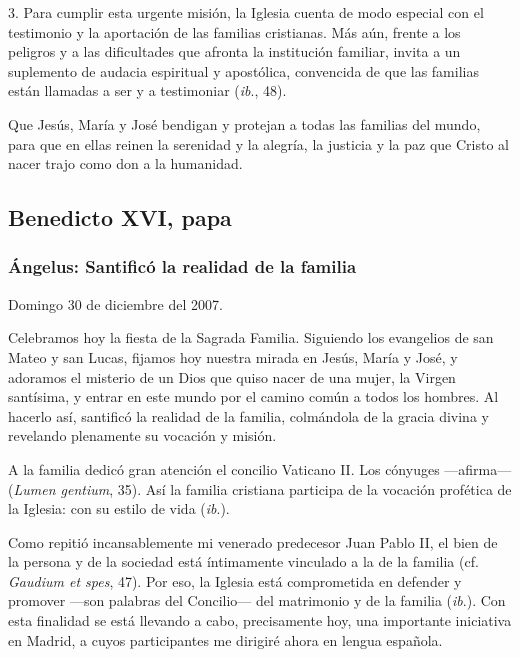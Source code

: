 3. Para cumplir esta urgente misión, la Iglesia cuenta de modo especial con el testimonio y la aportación de las familias cristianas. Más aún, frente a los peligros y a las dificultades que afronta la institución familiar, invita a un suplemento de audacia espiritual y apostólica, convencida de que las familias están llamadas a ser  y a testimoniar  (\emph{ib}., 48).

Que Jesús, María y José bendigan y protejan a todas las familias del mundo, para que en ellas reinen la serenidad y la alegría, la justicia y la paz que Cristo al nacer trajo como don a la humanidad.

\subsection{Benedicto XVI, papa}

\subsubsection{Ángelus: Santificó la realidad de la familia}

Domingo 30 de diciembre del 2007.

Celebramos hoy la fiesta de la Sagrada Familia. Siguiendo los evangelios de san Mateo y san Lucas, fijamos hoy nuestra mirada en Jesús, María y José, y adoramos el misterio de un Dios que quiso nacer de una mujer, la Virgen santísima, y entrar en este mundo por el camino común a todos los hombres. Al hacerlo así, santificó la realidad de la familia, colmándola de la gracia divina y revelando plenamente su vocación y misión.

A la familia dedicó gran atención el concilio Vaticano II. Los cónyuges ---afirma---  (\emph{Lumen gentium}, 35). Así la familia cristiana participa de la vocación profética de la Iglesia: con su estilo de vida  (\emph{ib}.).

Como repitió incansablemente mi venerado predecesor Juan Pablo II, el bien de la persona y de la sociedad está íntimamente vinculado a la  de la familia (cf. \emph{Gaudium et spes}, 47). Por eso, la Iglesia está comprometida en defender y promover  ---son palabras del Concilio--- del matrimonio y de la familia (\emph{ib}.). Con esta finalidad se está llevando a cabo, precisamente hoy, una importante iniciativa en Madrid, a cuyos participantes me dirigiré ahora en lengua española.

